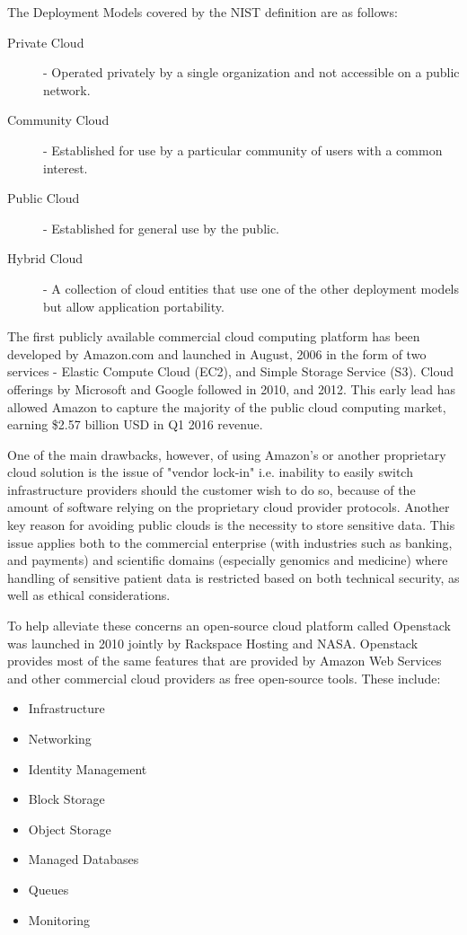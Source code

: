 The Deployment Models covered by the NIST definition are as follows:

\begin{description}
\item [Private Cloud] - Operated privately by a single organization and not accessible on a public network.
\item [Community Cloud] - Established for use by a particular community of users with a common interest.
\item [Public Cloud] - Established for general use by the public.
\item [Hybrid Cloud] - A collection of cloud entities that use one of the other deployment models but allow application portability.
\end{description}

The first publicly available commercial cloud computing platform has been developed by Amazon.com and launched in August, 2006 in the form of two services - Elastic Compute Cloud (EC2), and Simple Storage Service (S3). Cloud offerings by Microsoft and Google followed in 2010, and 2012. This early lead has allowed Amazon to capture the majority of the public cloud computing market, earning \$2.57 billion USD in Q1 2016 revenue.

One of the main drawbacks, however, of using Amazon's or another proprietary cloud solution is the issue of "vendor lock-in" i.e. inability to easily switch infrastructure providers should the customer wish to do so, because of the amount of software relying on the proprietary cloud provider protocols. Another key reason for avoiding public clouds is the necessity to store sensitive data. This issue applies both to the commercial enterprise (with industries such as banking, and payments) and scientific domains (especially genomics and medicine) where handling of sensitive patient data is restricted based on both technical security, as well as ethical considerations\autocite{knoppers2005human}.

To help alleviate these concerns an open-source cloud platform called Openstack was launched in 2010 jointly by Rackspace Hosting and NASA\autocite{sefraoui2012openstack}. Openstack provides most of the same features that are provided by Amazon Web Services and other commercial cloud providers as free open-source tools. These include:

\begin{itemize}
\item Infrastructure
\item Networking
\item Identity Management
\item Block Storage
\item Object Storage
\item Managed Databases
\item Queues
\item Monitoring
\end{itemize}

